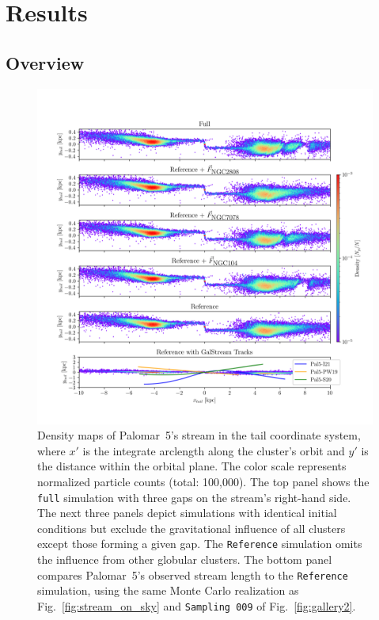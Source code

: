 \documentclass{aa}
\begin{document}
\section{Results}



  \subsection{Overview}

    \begin{figure}
      \centering
      \includegraphics[width=\linewidth]{decomposition-monte-carlo-009-with-3-gaps-domidpoint-shift.png}
      \caption{Density maps of Palomar~5's stream in the tail coordinate system, where $x\prime$ is the integrate arclength along the cluster's orbit and $y\prime$ is the distance within the orbital plane. The color scale represents normalized particle counts (total: 100,000). The top panel shows the \texttt{full} simulation with three gaps on the stream's right-hand side. The next three panels depict simulations with identical initial conditions but exclude the gravitational influence of all clusters except those forming a given gap. The \texttt{Reference} simulation omits the influence from other globular clusters. The bottom panel compares Palomar~5's observed stream length to the \texttt{Reference} simulation, using the same Monte Carlo realization as Fig.~\ref{fig:stream_on_sky} and \texttt{Sampling~009} of Fig.~\ref{fig:gallery2}.}
      \label{fig:decomposition}
    \end{figure} 
    
\end{document}
